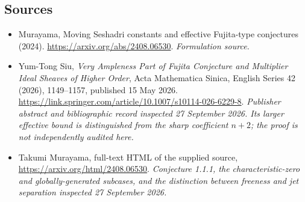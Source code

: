 \documentclass[11pt]{article}
\begin{document}
\subsection{Sources}
\begin{itemize}
\item[S1]Murayama, Moving Seshadri constants and effective Fujita-type conjectures (2024).
\url{https://arxiv.org/abs/2408.06530}.
\textit{Formulation source.}
\item[E1]Yum-Tong Siu, \emph{Very Ampleness Part of Fujita Conjecture
and Multiplier Ideal Sheaves of Higher Order}, Acta Mathematica Sinica,
English Series 42 (2026), 1149--1157, published 15 May 2026.
\url{https://link.springer.com/article/10.1007/s10114-026-6229-8}.
\textit{Publisher abstract and bibliographic record inspected
27 September 2026. Its larger effective bound is distinguished from
the sharp coefficient $n+2$; the proof is not independently audited here.}
\item[E2]Takumi Murayama, full-text HTML of the supplied source,
\url{https://arxiv.org/html/2408.06530}.
\textit{Conjecture 1.1.1, the characteristic-zero and globally-generated
subcases, and the distinction between freeness and jet separation
inspected 27 September 2026.}
\end{itemize}
\end{document}
